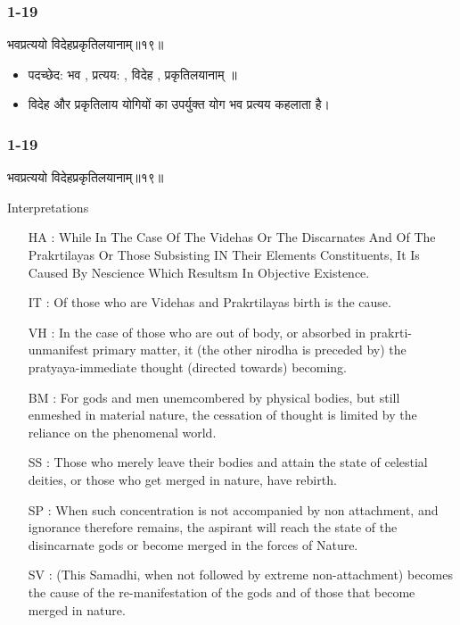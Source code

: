 \begin{frame}[fragile]\frametitle{1-19}
\begin{sanskrit}
भवप्रत्ययो विदेहप्रकृतिलयानाम्॥१९॥
\end{sanskrit}

\begin{itemize}
\item पदच्छेद: भव , प्रत्यय: , विदेह , प्रकृतिलयानाम् ॥
\item विदेह और प्रकृतिलाय योगियों का उपर्युक्त योग भव प्रत्यय कहलाता है।
\end{itemize}
	
\end{frame}

\begin{frame}[fragile]\frametitle{1-19}
\begin{sanskrit}
भवप्रत्ययो विदेहप्रकृतिलयानाम्॥१९॥
\end{sanskrit}

Interpretations
\begin{itemize}		
\item [HA]: While In The Case Of The Videhas Or The Discarnates And Of The Prakrtilayas Or Those Subsisting IN Their Elements Constituents, It Is Caused By Nescience Which Resultsm In Objective Existence.
\item [IT]: Of those who are Videhas and Prakrtilayas birth is the cause.
\item [VH]: In the case of those who are out of body, or absorbed in prakrti-unmanifest primary matter, it (the other nirodha is preceded by) the pratyaya-immediate thought (directed towards) becoming.
\item [BM]: For gods and men unemcombered by physical bodies, but still enmeshed in material nature, the cessation of thought is limited by the reliance on the phenomenal world.
\item [SS]: Those who merely leave their bodies and attain the state of celestial deities, or those who get merged in nature, have rebirth.
\item [SP]: When such concentration is not accompanied by non attachment, and ignorance therefore remains, the aspirant will reach the state of the disincarnate gods or become merged in the forces of Nature.
\item [SV]: (This Samadhi, when not followed by extreme non-attachment) becomes the cause of the re-manifestation of the gods and of those that become merged in nature. 
\end{itemize}
	
\end{frame}


